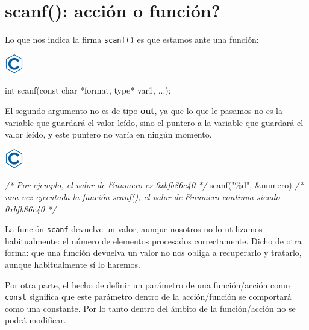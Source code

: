 \documentclass[
]{book}
\newenvironment{Shaded}{\begin{snugshade}}{\end{snugshade}}
\newcommand{\CommentTok}[1]{\textcolor[rgb]{0.56,0.35,0.01}{\textit{#1}}}
\newcommand{\DataTypeTok}[1]{\textcolor[rgb]{0.13,0.29,0.53}{#1}}
\newcommand{\NormalTok}[1]{#1}
\newcommand{\StringTok}[1]{\textcolor[rgb]{0.31,0.60,0.02}{#1}}
\begin{document}
\hypertarget{scanf-acciuxf3n-o-funciuxf3n}{%
\section{scanf(): acción o función?}\label{scanf-acciuxf3n-o-funciuxf3n}}

Lo que nos indica la firma \texttt{scanf()} es que estamos ante una función:

\includegraphics{./img/c.png}

\begin{Shaded}
\begin{Highlighting}[]
\DataTypeTok{int}\NormalTok{ scanf(}\DataTypeTok{const} \DataTypeTok{char}\NormalTok{ *format, type* var1, ...);}
\end{Highlighting}
\end{Shaded}

El segundo argumento no es de tipo \textbf{out}, ya que lo que le pasamos no es la variable que guardará el valor leído, sino el puntero a la variable que guardará el valor leído, y este puntero no varía en ningún momento.

\includegraphics{./img/c.png}

\begin{Shaded}
\begin{Highlighting}[]
\CommentTok{/* Por ejemplo, el valor de \&numero es 0xbfb86c40 */}
\NormalTok{scanf(}\StringTok{"\%d"}\NormalTok{, \&numero)}
\CommentTok{/* una vez ejecutada la función scanf(), el valor de \&numero continua siendo 0xbfb86c40 */}
\end{Highlighting}
\end{Shaded}

La función \texttt{scanf} devuelve un valor, aunque nosotros no lo utilizamos habitualmente: el número de elementos procesados correctamente. Dicho de otra forma: que una función devuelva un valor no nos obliga a recuperarlo y tratarlo, aunque habitualmente sí lo haremos.

Por otra parte, el hecho de definir un parámetro de una función/acción como \texttt{const} significa que este parámetro dentro de la acción/función se comportará como una constante. Por lo tanto dentro del ámbito de la función/acción no se podrá modificar.
\end{document}
